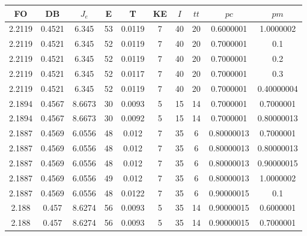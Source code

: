 \begin{table}[h!]
    \footnotesize
    \begin{center}
        \begin{tabular}{|c|c|c|c|c|c|c|c|c|c|}
        \hline
            {\bf FO} & {\bf DB} & $J_e$ & {\bf E} & {\bf T} & {\bf KE} & $I$ & $tt$ & $pc$ & $pm$ \\
        \hline
        \hline
            2.2119 & 0.4521  & 6.345 & 53 & 0.0119 & 7 & 40 & 20 & 0.6000001 & 1.0000002\\
        \hline
        \hline
            2.2119 & 0.4521  & 6.345 & 52 & 0.0119 & 7 & 40 & 20 & 0.7000001 & 0.1\\
        \hline
        \hline
            2.2119 & 0.4521  & 6.345 & 52 & 0.0119 & 7 & 40 & 20 & 0.7000001 & 0.2\\
        \hline
        \hline
            2.2119 & 0.4521  & 6.345 & 52 & 0.0117 & 7 & 40 & 20 & 0.7000001 & 0.3\\
        \hline
        \hline
            2.2119 & 0.4521  & 6.345 & 52 & 0.0119 & 7 & 40 & 20 & 0.7000001 & 0.40000004\\
        \hline
        \hline
            2.1894 & 0.4567  & 8.6673 & 30 & 0.0093 & 5 & 15 & 14 & 0.7000001 & 0.7000001\\
        \hline
        \hline
            2.1894 & 0.4567  & 8.6673 & 30 & 0.0092 & 5 & 15 & 14 & 0.7000001 & 0.80000013\\
        \hline
        \hline
            2.1887 & 0.4569  & 6.0556 & 48 & 0.012 & 7 & 35 & 6 & 0.80000013 & 0.7000001\\
        \hline
        \hline
            2.1887 & 0.4569  & 6.0556 & 48 & 0.012 & 7 & 35 & 6 & 0.80000013 & 0.80000013\\
        \hline
        \hline
            2.1887 & 0.4569  & 6.0556 & 48 & 0.012 & 7 & 35 & 6 & 0.80000013 & 0.90000015\\
        \hline
        \hline
            2.1887 & 0.4569  & 6.0556 & 49 & 0.012 & 7 & 35 & 6 & 0.80000013 & 1.0000002\\
        \hline
        \hline
            2.1887 & 0.4569  & 6.0556 & 48 & 0.0122 & 7 & 35 & 6 & 0.90000015 & 0.1\\
        \hline
        \hline
            2.188 & 0.457  & 8.6274 & 56 & 0.0093 & 5 & 35 & 14 & 0.90000015 & 0.6000001\\
        \hline
        \hline
            2.188 & 0.457  & 8.6274 & 56 & 0.0093 & 5 & 35 & 14 & 0.90000015 & 0.7000001\\

\end{tabular}
\end{center}
\end{table}
